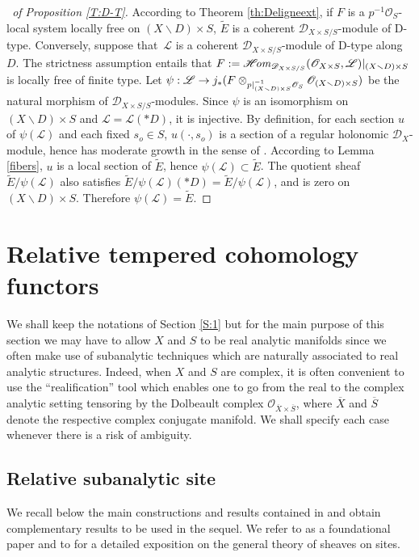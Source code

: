 \documentclass[english]{smfart}
\numberwithin{subsection}{section}
\def\shd{\mathcal{D}}\let\cD\shd
\def\shl{\mathcal{L}}
\def\sho{\mathcal{O}}\let\cO\sho
\newcommand{\XS}{X\times S}
\newcommand{\DXS}{\shd_{\XS/S}}
\let\tilde\widetilde
\let\wt\widetilde
\let\setminus\smallsetminus
\newcommand{\pOS}{p^{-1}\sho_S}
\numberwithin{equation}{section}
\theoremstyle{plain}
\theoremstyle{definition}
\def\to{\mathchoice{\longrightarrow}{\rightarrow}{\rightarrow}{\rightarrow}}
\begin{document}
\begin{proof}[\proofname\ of Proposition \ref{T:D-T}]
According to Theorem \ref{th:Deligneext}, if $F$ is a $\pOS$-local system locally free on \hbox{$(X\setminus D)\times S$}, $\tilde{E}$ is a coherent $\DXS$-module of D-type. Conversely, suppose that~$\shl$ is a coherent $\DXS$-module of D-type along $D$. The strictness assumption entails that $F:=\ho_{\DXS}(\cO_{\XS}, \shl)|_{(X\setminus D)\times S}$ is locally free of finite type.
Let $\psi:\shl\to j_*(F\otimes_{p|_{(X\setminus D)\times S}^{-1}\sho_S}\sho_{(X\setminus D)\times S})$ be the natural morphism of $\DXS$-modules. Since $\psi$ is an isomorphism on $(X\setminus D)\times S$ and $\shl=\shl(*D)$, it is injective. By definition, for each section $u$ of $\psi(\shl)$ and each fixed $s_o\in S$, $u(\cdot,s_o)$ is a section of a regular holonomic $\cD_X$-module, hence has moderate growth in the sense of \cite[p.\,862]{K-K81}. According to Lemma \ref{fibers}, $u$ is a local section of $\wt E$, hence $\psi(\shl)\subset\wt E$. The quotient sheaf $\wt E/\psi(\shl)$ also satisfies $\wt E/\psi(\shl)(*D)=\wt E/\psi(\shl)$, and is zero on $(X\setminus D)\times S$. Therefore $\psi(\shl)=\tilde{E}$.
\end{proof}

\section{Relative tempered cohomology functors}\label{sec:3}
We shall keep the notations of Section \ref{S:1} but for the main purpose of this section we may have to allow $X$ and $S$ to be real analytic manifolds since we often make use of subanalytic techniques which are naturally associated to real analytic structures. Indeed, when $X$ and $S$ are complex, it is often convenient to use the ``realification'' tool which enables one to go from the real to the complex analytic setting tensoring by the Dolbeault complex $\sho_{\overline{X}\times \overline{S}}$, where $\overline{X}$ and $\overline{S}$ denote the respective complex conjugate manifold.
We shall specify each case whenever there is a risk of ambiguity.

\subsection{Relative subanalytic site}\label{subsec:relsubanalytic}
We recall below the main constructions and results contained in \cite{MF-P14} and obtain complementary results to be used in the sequel. We refer to \cite{K-S01} as a foundational paper and to \cite{K-Sch06} for a detailed exposition on the general theory of sheaves on sites.
\end{document}
